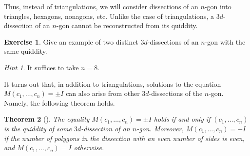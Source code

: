 \documentclass[a4paper,11pt]{amsart}
\theoremstyle{plain}
\newtheorem{theorem}{Theorem}[section]
\theoremstyle{remark}
\newtheorem*{hint}{Hint}
\theoremstyle{definition}
\newtheorem{exercise}[theorem]{Exercise}
\numberwithin{equation}{section}
\numberwithin{figure}{section}
\begin{document}
Thus, instead of triangulations, we will consider dissections of an $n$-gon into triangles, hexagons, nonagons, etc. Unlike the case of triangulations, a $3d$-dissection of an $n$-gon cannot be reconstructed from its quiddity.

\begin{exercise}
Give an example of two distinct $3d$-dissections of an $n$-gon with the same quiddity.
\end{exercise}

\begin{hint}
It suffices to take $n=8$.
\end{hint}

It turns out that, in addition to triangulations, solutions to the equation $M(c_1,\dots,c_n)=\pm I$ can also arise from other $3d$-dissections of the $n$-gon. Namely, the following theorem holds.

\begin{theorem}[\cite{Ovsienko18}] The equality $M(c_1,\dots, c_n)=\pm I$ holds if and only if $(c_1,\dots,c_n)$ is the quiddity of some $3d$-dissection of an $n$-gon. Moreover, $M(c_1,\dots, c_n)=- I$ if the number of polygons in the dissection with an even number of sides is even, and $M(c_1,\dots, c_n)=I$ otherwise.
\end{theorem}



\end{document}
